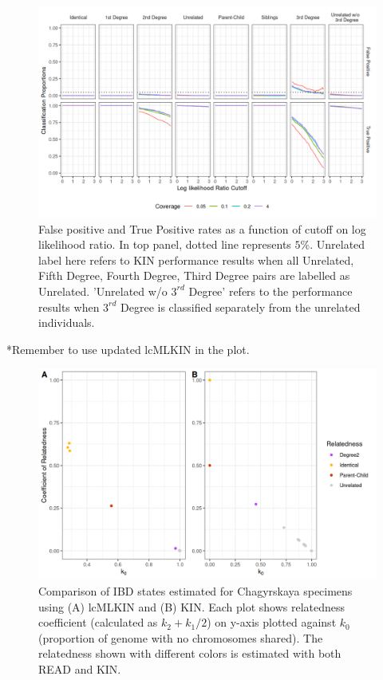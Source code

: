 \documentclass[12pt, letterpaper]{article}
\begin{document}
\begin{figure}[h!]
    \includegraphics[width=16cm]{plots/plotimg/contam0_inbred0_model_performance_allroc_asc0_plot.png}
    \centering
    \caption{False positive and True Positive rates as a function of cutoff on log likelihood ratio. In top panel, dotted line represents $5\%$. Unrelated label here refers to KIN performance results when all Unrelated, Fifth Degree, Fourth Degree, Third Degree pairs are labelled as Unrelated. 'Unrelated w/o $3^{rd}$ Degree' refers to the performance results when $3^{rd}$ Degree is classified separately from the unrelated individuals.}
    \label{figS10:cutoff}
\end{figure}


*Remember to use updated lcMLKIN in the plot.
\begin{figure}[h!]
    \centering
    \includegraphics[width=18cm]{supplementary_info/plots/lcPlot.png}
    \caption{Comparison of IBD states estimated for Chagyrskaya specimens using (A) lcMLKIN and (B) KIN. Each plot shows relatedness coefficient (calculated as $k_2+k_1/2$) on y-axis plotted against $k_0$ (proportion of genome with no chromosomes shared).
    The relatedness shown with different colors is estimated with both READ and KIN.}
    \label{figS6:Chagyrskaya_ibd}
\end{figure}
\end{document}

